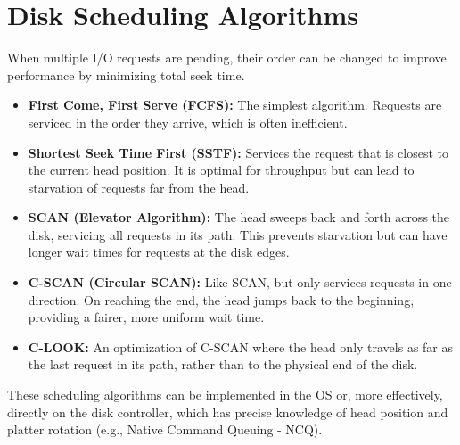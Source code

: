 \section{Disk Scheduling Algorithms}
When multiple I/O requests are pending, their order can be changed to improve performance by minimizing total seek time.
\begin{itemize}
    \item \textbf{First Come, First Serve (FCFS):} The simplest algorithm. Requests are serviced in the order they arrive, which is often inefficient.
    \item \textbf{Shortest Seek Time First (SSTF):} Services the request that is closest to the current head position. It is optimal for throughput but can lead to starvation of requests far from the head.
    \item \textbf{SCAN (Elevator Algorithm):} The head sweeps back and forth across the disk, servicing all requests in its path. This prevents starvation but can have longer wait times for requests at the disk edges.
    \item \textbf{C-SCAN (Circular SCAN):} Like SCAN, but only services requests in one direction. On reaching the end, the head jumps back to the beginning, providing a fairer, more uniform wait time.
    \item \textbf{C-LOOK:} An optimization of C-SCAN where the head only travels as far as the last request in its path, rather than to the physical end of the disk.
\end{itemize}
These scheduling algorithms can be implemented in the OS or, more effectively, directly on the disk controller, which has precise knowledge of head position and platter rotation (e.g., Native Command Queuing - NCQ).